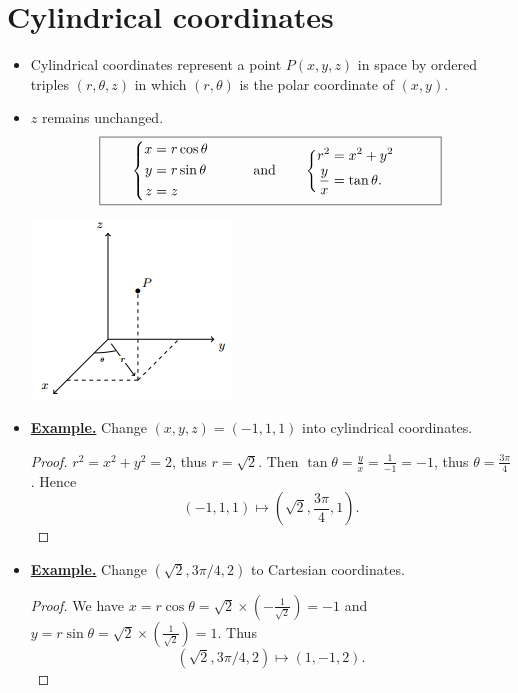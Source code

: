 
\section{Cylindrical coordinates}
\begin{itemize}
    \item Cylindrical coordinates represent a point $P(x,y,z)$ in space by ordered triples $(r,\theta, z)$ in which $(r,\theta)$ is the polar coordinate of $(x,y)$.
    \item $z$ remains unchanged.
    \begin{equation*}
    \fbox{$
    \qquad
        \begin{cases}
            \begin{aligned}
                x &= r\cos \theta \\
                y &= r\sin \theta \\
                z &= z 
            \end{aligned}
        \end{cases} \qquad 
        \text{and}\qquad 
        \begin{cases}
            \begin{aligned}
                r^2 &= x^2 + y^2  \\
                \frac{y}{x} &= \tan \theta .
            \end{aligned}
        \end{cases}
        \qquad
        $}
    \end{equation*}
    \begin{center}
        \includegraphics[scale=0.7]{images/09-cylindrical.png}
    \end{center}
    \item \underline{\textbf{Example.}} Change $(x,y,z) = (-1,1,1)$ into cylindrical coordinates.
    \begin{proof} $r^2 = x^2+y^2 = 2$, thus $r=\sqrt{2}$. Then $\tan\theta = \frac{y}{x} = \frac{1}{-1} = -1$, thus $\theta = \frac{3\pi}{4}$. Hence 
    $$(-1,1,1)\mapsto \left(\sqrt{2}, \frac{3\pi}{4}, 1\right).$$
    \end{proof}
    \item \underline{\textbf{Example.}} Change $(\sqrt{2}, 3\pi/4, 2)$ to Cartesian coordinates.
    \begin{proof} We have $x = r\cos \theta = \sqrt{2}\times \left(-\frac{1}{\sqrt{2}}\right) = -1$ and $y = r\sin \theta = \sqrt{2}\times \left(\frac{1}{\sqrt{2}}\right) = 1$. Thus 
    $$(\sqrt{2}, 3\pi/4, 2)\mapsto (1,-1, 2).$$
    \end{proof}
\end{itemize}

